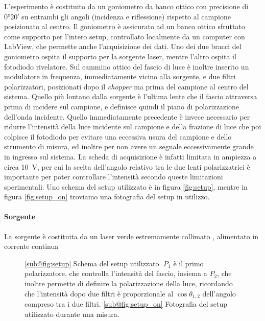 \documentclass[prb,showpacs,floatfix,altaffilletter,amsmath,amssymb,reprint,citeautoscript]{revtex4-1}
\begin{document}
L'esperimento è costituito da un goniometro da banco ottico con precisione di \ang{0;20} su entrambi gli angoli (incidenza e riflessione) rispetto al campione posizionato al centro. Il goniometro è assicurato ad un banco ottico sfruttato come supporto per l'intero setup, controllato localmente da un computer con LabView, che permette anche l'acquisizione dei dati. Uno dei due bracci del goniometro ospita il supporto per la sorgente laser, mentre l'altro ospita il fotodiodo rivelatore. Sul cammino ottico del fascio di luce è inoltre inserito un modulatore in frequenza, immediatamente vicino alla sorgente, e due filtri polarizzatori, posizionati dopo il \emph{chopper} ma prima del campione al centro del sistema. Quello più lontano dalla sorgente è l'ultima lente che il fascio attraversa prima di incidere sul campione, e definisce quindi il piano di polarizzazione dell'onda incidente. Quello immediatamente precedente è invece necessario per ridurre l'intensità della luce incidente sul campione e della frazione di luce che poi colpisce il fotodiodo per evitare una eccessiva usura del campione e dello strumento di misura, ed inoltre per non avere un segnale eccessivamente grande in ingresso sul sistema. La scheda di acquisizione è infatti limitata in ampiezza a circa \SI{10}{\volt}, per cui la scelta dell'angolo relativo tra le due lenti polarizzatrici è importante per poter controllare l'intensità secondo queste limitazioni sperimentali. Uno schema del setup utilizzato è in figura \ref{fig:setup}, mentre in figura \ref{fig:setup_on} troviamo una fotografia del setup in utilizzo. 

\paragraph{Sorgente} La sorgente è costituita da un laser verde estremamente collimato , alimentato in corrente continua 


\begin{figure}
    \centering
    \caption{\ref{sub@fig:setup} Schema del setup utilizzato. $P_1$ è il primo polarizzatore, che controlla l'intensità del fascio, insiema a $P_2$, che inoltre permette di definire la polarizzazione della luce, ricordando che l'intensità dopo due filtri è proporzionale al $\cos\theta_{1,2}$ dell'angolo compreso tra i due filtri. \ref{sub@fig:setup_on} Fotografia del setup utilizzato durante una misura. }
    \label{fig:setup_and_photo}
\end{figure}
\end{document}
